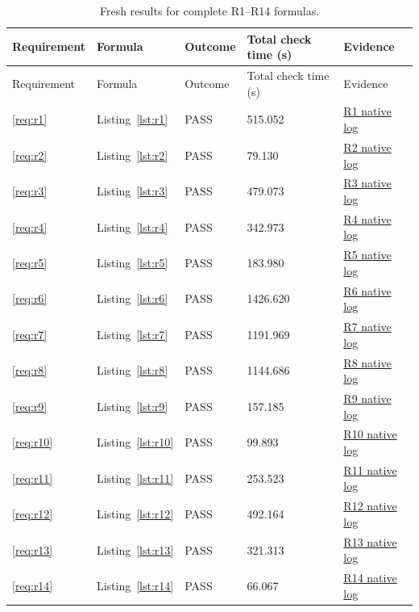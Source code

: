 \begin{longtable}{@{}p{}p{}p{}p{}p{}@{}}
\caption{Fresh results for complete R1--R14 formulas.}\label{tab:results}\\
\toprule Requirement & Formula & Outcome & Total check time (s) & Evidence \\ \midrule\endfirsthead
\toprule Requirement & Formula & Outcome & Total check time (s) & Evidence \\ \midrule\endhead
\bottomrule\endlastfoot
\ref{req:r1} & Listing~\ref{lst:r1} & PASS & 515.052 & \href{../verification/original/logs/R1.pbessolve.log}{R1 native log} \\
\ref{req:r2} & Listing~\ref{lst:r2} & PASS & 79.130 & \href{../verification/original/logs/R2.pbessolve.log}{R2 native log} \\
\ref{req:r3} & Listing~\ref{lst:r3} & PASS & 479.073 & \href{../verification/original/logs/R3.pbessolve.log}{R3 native log} \\
\ref{req:r4} & Listing~\ref{lst:r4} & PASS & 342.973 & \href{../verification/original/logs/R4.pbessolve.log}{R4 native log} \\
\ref{req:r5} & Listing~\ref{lst:r5} & PASS & 183.980 & \href{../verification/original/logs/R5.pbessolve.log}{R5 native log} \\
\ref{req:r6} & Listing~\ref{lst:r6} & PASS & 1426.620 & \href{../verification/original/logs/R6.pbessolve.log}{R6 native log} \\
\ref{req:r7} & Listing~\ref{lst:r7} & PASS & 1191.969 & \href{../verification/original/logs/R7.pbessolve.log}{R7 native log} \\
\ref{req:r8} & Listing~\ref{lst:r8} & PASS & 1144.686 & \href{../verification/original/logs/R8.pbessolve.log}{R8 native log} \\
\ref{req:r9} & Listing~\ref{lst:r9} & PASS & 157.185 & \href{../verification/original/logs/R9.pbessolve.log}{R9 native log} \\
\ref{req:r10} & Listing~\ref{lst:r10} & PASS & 99.893 & \href{../verification/original/logs/R10.pbessolve.log}{R10 native log} \\
\ref{req:r11} & Listing~\ref{lst:r11} & PASS & 253.523 & \href{../verification/original/logs/R11.pbessolve.log}{R11 native log} \\
\ref{req:r12} & Listing~\ref{lst:r12} & PASS & 492.164 & \href{../verification/r12-guarded/logs/R12.pbessolve.log}{R12 native log} \\
\ref{req:r13} & Listing~\ref{lst:r13} & PASS & 321.313 & \href{../verification/original/logs/R13.pbessolve.log}{R13 native log} \\
\ref{req:r14} & Listing~\ref{lst:r14} & PASS & 66.067 & \href{../verification/original/logs/R14.pbessolve.log}{R14 native log} \\
\end{longtable}
